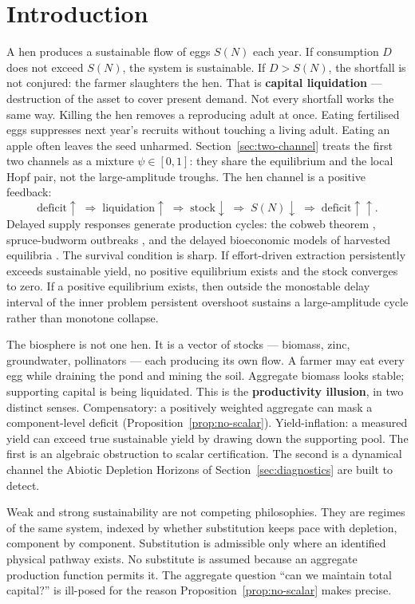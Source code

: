 \documentclass[11pt]{article}
\theoremstyle{definition}
\begin{document}
\section{Introduction}
\label{sec:introduction}

A hen produces a sustainable flow of eggs $S(N)$ each year. If consumption $D$ does not exceed $S(N)$, the system is sustainable. If $D>S(N)$, the shortfall is not conjured: the farmer slaughters the hen. That is \textbf{capital liquidation} --- destruction of the asset to cover present demand. Not every shortfall works the same way. Killing the hen removes a reproducing adult at once. Eating fertilised eggs suppresses next year's recruits without touching a living adult. Eating an apple often leaves the seed unharmed. Section~\ref{sec:two-channel} treats the first two channels as a mixture $\psi\in[0,1]$: they share the equilibrium and the local Hopf pair, not the large-amplitude troughs. The hen channel is a positive feedback:
\[
\text{deficit}\uparrow \;\Rightarrow\; \text{liquidation}\uparrow \;\Rightarrow\; \text{stock}\downarrow \;\Rightarrow\; S(N)\downarrow \;\Rightarrow\; \text{deficit}\uparrow\uparrow.
\]
Delayed supply responses generate production cycles: the cobweb theorem \cite{ezekiel1938}, spruce-budworm outbreaks \cite{ludwig1978}, and the delayed bioeconomic models of harvested equilibria \cite{gao2022,khiyar2026}. The survival condition is sharp. If effort-driven extraction persistently exceeds sustainable yield, no positive equilibrium exists and the stock converges to zero. If a positive equilibrium exists, then outside the monostable delay interval of the inner problem persistent overshoot sustains a large-amplitude cycle rather than monotone collapse.

The biosphere is not one hen. It is a vector of stocks --- biomass, zinc, groundwater, pollinators --- each producing its own flow. A farmer may eat every egg while draining the pond and mining the soil. Aggregate biomass looks stable; supporting capital is being liquidated. This is the \textbf{productivity illusion}, in two distinct senses. Compensatory: a positively weighted aggregate can mask a component-level deficit (Proposition~\ref{prop:no-scalar}). Yield-inflation: a measured yield can exceed true sustainable yield by drawing down the supporting pool. The first is an algebraic obstruction to scalar certification. The second is a dynamical channel the Abiotic Depletion Horizons of Section~\ref{sec:diagnostics} are built to detect.

Weak and strong sustainability \cite{daly1990} are not competing philosophies. They are regimes of the same system, indexed by whether substitution keeps pace with depletion, component by component. Substitution is admissible only where an identified physical pathway exists. No substitute is assumed because an aggregate production function permits it. The aggregate question ``can we maintain total capital?'' is ill-posed for the reason Proposition~\ref{prop:no-scalar} makes precise.
\end{document}
